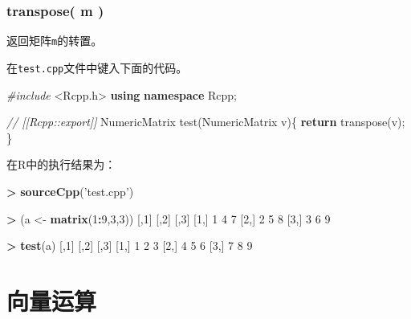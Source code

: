 \documentclass[]{ctexbook}
\newenvironment{Shaded}{\begin{snugshade}}{\end{snugshade}}
\newcommand{\KeywordTok}[1]{\textcolor[rgb]{0.13,0.29,0.53}{\textbf{#1}}}
\newcommand{\DecValTok}[1]{\textcolor[rgb]{0.00,0.00,0.81}{#1}}
\newcommand{\StringTok}[1]{\textcolor[rgb]{0.31,0.60,0.02}{#1}}
\newcommand{\ImportTok}[1]{#1}
\newcommand{\CommentTok}[1]{\textcolor[rgb]{0.56,0.35,0.01}{\textit{#1}}}
\newcommand{\ControlFlowTok}[1]{\textcolor[rgb]{0.13,0.29,0.53}{\textbf{#1}}}
\newcommand{\OperatorTok}[1]{\textcolor[rgb]{0.81,0.36,0.00}{\textbf{#1}}}
\newcommand{\PreprocessorTok}[1]{\textcolor[rgb]{0.56,0.35,0.01}{\textit{#1}}}
\newcommand{\NormalTok}[1]{#1}
\begin{document}
\subsection{transpose( m )}\label{transpose}

返回矩阵\texttt{m}的转置。

在\texttt{test.cpp}文件中键入下面的代码。

\begin{Shaded}
\begin{Highlighting}[]
\PreprocessorTok{#include }\ImportTok{<Rcpp.h>}
\KeywordTok{using} \KeywordTok{namespace}\NormalTok{ Rcpp;}

\CommentTok{// [[Rcpp::export]]}
\NormalTok{NumericMatrix test(NumericMatrix v)\{}
  \ControlFlowTok{return}\NormalTok{ transpose(v);}
\NormalTok{\}}
\end{Highlighting}
\end{Shaded}

在R中的执行结果为：

\begin{Shaded}
\begin{Highlighting}[]
\OperatorTok{>}\StringTok{ }\KeywordTok{sourceCpp}\NormalTok{(}\StringTok{'test.cpp'}\NormalTok{)}

\OperatorTok{>}\StringTok{ }\NormalTok{(a <-}\StringTok{ }\KeywordTok{matrix}\NormalTok{(}\DecValTok{1}\OperatorTok{:}\DecValTok{9}\NormalTok{,}\DecValTok{3}\NormalTok{,}\DecValTok{3}\NormalTok{))}
\NormalTok{     [,}\DecValTok{1}\NormalTok{] [,}\DecValTok{2}\NormalTok{] [,}\DecValTok{3}\NormalTok{]}
\NormalTok{[}\DecValTok{1}\NormalTok{,]    }\DecValTok{1}    \DecValTok{4}    \DecValTok{7}
\NormalTok{[}\DecValTok{2}\NormalTok{,]    }\DecValTok{2}    \DecValTok{5}    \DecValTok{8}
\NormalTok{[}\DecValTok{3}\NormalTok{,]    }\DecValTok{3}    \DecValTok{6}    \DecValTok{9}

\OperatorTok{>}\StringTok{ }\KeywordTok{test}\NormalTok{(a)}
\NormalTok{     [,}\DecValTok{1}\NormalTok{] [,}\DecValTok{2}\NormalTok{] [,}\DecValTok{3}\NormalTok{]}
\NormalTok{[}\DecValTok{1}\NormalTok{,]    }\DecValTok{1}    \DecValTok{2}    \DecValTok{3}
\NormalTok{[}\DecValTok{2}\NormalTok{,]    }\DecValTok{4}    \DecValTok{5}    \DecValTok{6}
\NormalTok{[}\DecValTok{3}\NormalTok{,]    }\DecValTok{7}    \DecValTok{8}    \DecValTok{9}
\end{Highlighting}
\end{Shaded}

\chapter{向量运算}\label{Vector-operations}
\end{document}
